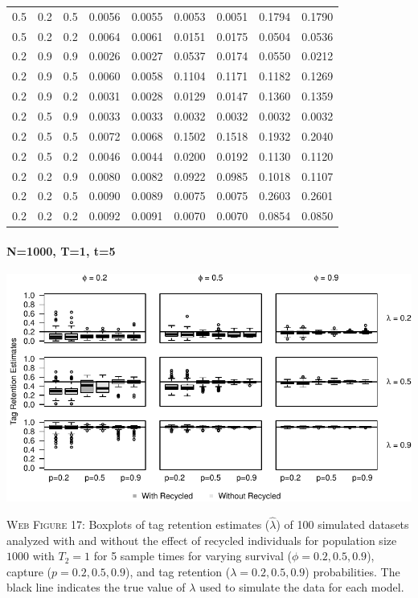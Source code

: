 \documentclass[]{article}
\let\oldparagraph\paragraph
\renewcommand{\paragraph}[1]{\oldparagraph{#1}\mbox{}}
\begin{document}
\begin{table}[ht]
{\begin{tabular}{rrrrrrrrr}
  0.5 & 0.2 & 0.5 & 0.0056 & 0.0055 & 0.0053 & 0.0051 & 0.1794 & 0.1790 \\ 
  0.5 & 0.2 & 0.2 & 0.0064 & 0.0061 & 0.0151 & 0.0175 & 0.0504 & 0.0536 \\ 
  0.2 & 0.9 & 0.9 & 0.0026 & 0.0027 & 0.0537 & 0.0174 & 0.0550 & 0.0212 \\ 
  0.2 & 0.9 & 0.5 & 0.0060 & 0.0058 & 0.1104 & 0.1171 & 0.1182 & 0.1269 \\ 
  0.2 & 0.9 & 0.2 & 0.0031 & 0.0028 & 0.0129 & 0.0147 & 0.1360 & 0.1359 \\ 
  0.2 & 0.5 & 0.9 & 0.0033 & 0.0033 & 0.0032 & 0.0032 & 0.0032 & 0.0032 \\ 
  0.2 & 0.5 & 0.5 & 0.0072 & 0.0068 & 0.1502 & 0.1518 & 0.1932 & 0.2040 \\ 
  0.2 & 0.5 & 0.2 & 0.0046 & 0.0044 & 0.0200 & 0.0192 & 0.1130 & 0.1120 \\ 
  0.2 & 0.2 & 0.9 & 0.0080 & 0.0082 & 0.0922 & 0.0985 & 0.1018 & 0.1107 \\ 
  0.2 & 0.2 & 0.5 & 0.0090 & 0.0089 & 0.0075 & 0.0075 & 0.2603 & 0.2601 \\ 
  0.2 & 0.2 & 0.2 & 0.0092 & 0.0091 & 0.0070 & 0.0070 & 0.0854 & 0.0850 \\ 
   \hline
\end{tabular}
}
\endgroup
\end{table}

\newpage

\paragraph{N=1000, T=1, t=5}\label{n1000-t1-t5-2}

\includegraphics{Appendix_BW_files/figure-latex/figure17_tagretention_GJSTL5-1.pdf}

\textsc{Web Figure 17:} Boxplots of tag retention estimates
(\(\hat{\lambda}\)) of 100 simulated datasets analyzed with and without
the effect of recycled individuals for population size \(1000\) with
\(T_2=1\) for 5 sample times for varying survival
(\(\phi=0.2,0.5,0.9\)), capture (\(p=0.2,0.5,0.9\)), and tag retention
(\(\lambda=0.2,0.5,0.9\)) probabilities. The black line indicates the
true value of \(\lambda\) used to simulate the data for each model.
\end{document}
